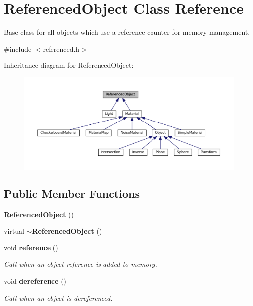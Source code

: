 \section{Referenced\+Object Class Reference}
\label{class_referenced_object}


Base class for all objects which use a reference counter for memory management.  




{\ttfamily \#include $<$referenced.\+h$>$}



Inheritance diagram for Referenced\+Object\+:
\nopagebreak
\begin{figure}[H]
\begin{center}
\leavevmode
\includegraphics[width=350pt]{class_referenced_object__inherit__graph}
\end{center}
\end{figure}
\subsection*{Public Member Functions}
\begin{DoxyCompactItemize}
\item 
{\bf Referenced\+Object} ()
\item 
virtual {\bf $\sim$\+Referenced\+Object} ()
\item 
void {\bf reference} ()
\begin{DoxyCompactList}\small\item\em Call when an object reference is added to memory. \end{DoxyCompactList}\item 
void {\bf dereference} ()
\begin{DoxyCompactList}\small\item\em Call when an object is dereferenced. \end{DoxyCompactList}\end{DoxyCompactItemize}
